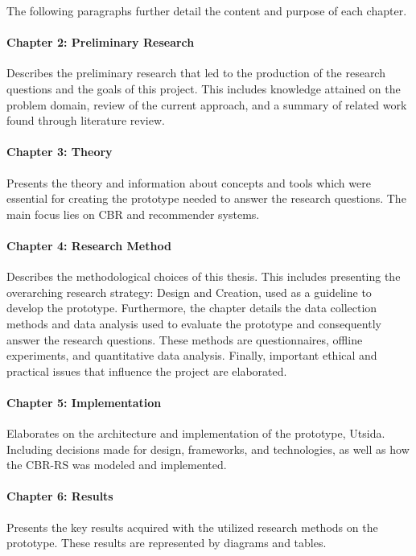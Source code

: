 The following paragraphs further detail the content and purpose of each chapter.

\paragraph{Chapter 2: Preliminary Research}
Describes the preliminary research that led to the production of the research questions and the goals of this project. This includes knowledge attained on the problem domain, review of the current approach, and a summary of related work found through literature review.

\paragraph{Chapter 3: Theory}
Presents the theory and information about concepts and tools which were essential for creating the prototype needed to answer the research questions. The main focus lies on CBR and recommender systems. 

\paragraph{Chapter 4: Research Method}
Describes the methodological choices of this thesis. This includes presenting the overarching research strategy: Design and Creation, used as a guideline to develop the prototype. Furthermore, the chapter details the data collection methods and data analysis used to evaluate the prototype and consequently answer the research questions. These methods are questionnaires, offline experiments, and quantitative data analysis. Finally, important ethical and practical issues that influence the project are elaborated. 

\paragraph{Chapter 5: Implementation}
Elaborates on the architecture and implementation of the prototype, Utsida. Including decisions made for design, frameworks, and technologies, as well as how the CBR-RS was modeled and implemented.

\paragraph{Chapter 6: Results}
Presents the key results acquired with the utilized research methods on the prototype. These results are represented by diagrams and tables.

